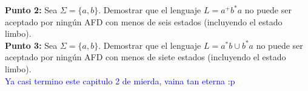 \textbf{Punto 2: } Sea $\Sigma=\{a,b\}.$ Demostrar que el lenguaje $L=a^+b^*a$ no puede ser aceptado por ningún AFD con menos de seis estados (incluyendo el estado limbo).\\

\textbf{Punto 3: } Sea $\Sigma=\{a,b\}.$ Demostrar que el lenguaje $L=a^*b\cup b^*a$ no puede ser aceptado por ningún AFD con menos de siete estados (incluyendo el estado limbo).\\

\textcolor{blue}{Ya casi termino este capitulo 2 de mierda, vaina tan eterna :p}
